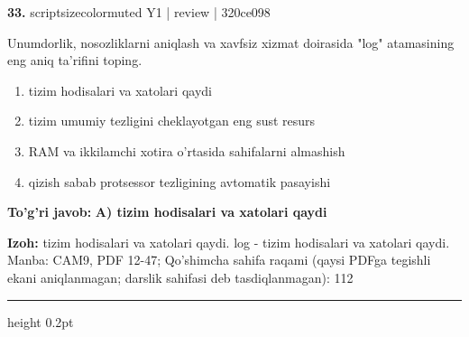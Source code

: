 \documentclass[10pt,a4paper]{article}
\begin{document}
{\bfseries\sffamily\color{ink} 33.} {scriptsizecolor{muted} Y1 | review | 320ce098}
\par
Unumdorlik, nosozliklarni aniqlash va xavfsiz xizmat doirasida "log" atamasining eng aniq ta'rifini toping.
\begin{enumerate}[label=\Alph*),leftmargin=9mm]
\item tizim hodisalari va xatolari qaydi
\item tizim umumiy tezligini cheklayotgan eng sust resurs
\item RAM va ikkilamchi xotira o'rtasida sahifalarni almashish
\item qizish sabab protsessor tezligining avtomatik pasayishi
\end{enumerate}
\begin{tcolorbox}[enhanced,breakable,colback=teal!4,colframe=teal!60!black,boxrule=0.45pt,arc=1.2mm,left=2.7mm,right=2.7mm,top=1.8mm,bottom=1.8mm,before skip=2mm,after skip=2mm]
{\bfseries\sffamily\color{teal}To'g'ri javob:} \textbf{A) tizim hodisalari va xatolari qaydi}
\par\smallskip
{\bfseries Izoh:} tizim hodisalari va xatolari qaydi. log - tizim hodisalari va xatolari qaydi. Manba: CAM9, PDF 12-47; Qo'shimcha sahifa raqami (qaysi PDFga tegishli ekani aniqlanmagan; darslik sahifasi deb tasdiqlanmagan): 112
\end{tcolorbox}
\vspace{2mm}\hrule height 0.2pt\vspace{3mm}
\end{document}
